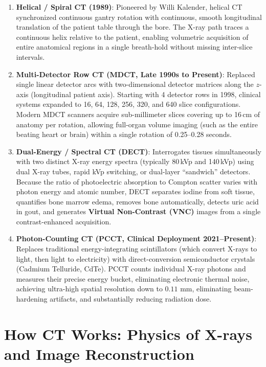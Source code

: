 \documentclass[11pt,a4paper]{article}
\begin{document}
\begin{enumerate}[leftmargin=*]
    \item \textbf{Helical / Spiral CT (1989)}: Pioneered by Willi Kalender, helical CT synchronized continuous gantry rotation with continuous, smooth longitudinal translation of the patient table through the bore. The X-ray path traces a continuous helix relative to the patient, enabling volumetric acquisition of entire anatomical regions in a single breath-hold without missing inter-slice intervals.
    \item \textbf{Multi-Detector Row CT (MDCT, Late 1990s to Present)}: Replaced single linear detector arcs with two-dimensional detector matrices along the $z$-axis (longitudinal patient axis). Starting with 4 detector rows in 1998, clinical systems expanded to 16, 64, 128, 256, 320, and 640 slice configurations. Modern MDCT scanners acquire sub-millimeter slices covering up to 16\,cm of anatomy per rotation, allowing full-organ volume imaging (such as the entire beating heart or brain) within a single rotation of 0.25--0.28 seconds.
    \item \textbf{Dual-Energy / Spectral CT (DECT)}: Interrogates tissues simultaneously with two distinct X-ray energy spectra (typically 80\,kVp and 140\,kVp) using dual X-ray tubes, rapid kVp switching, or dual-layer ``sandwich'' detectors. Because the ratio of photoelectric absorption to Compton scatter varies with photon energy and atomic number, DECT separates iodine from soft tissue, quantifies bone marrow edema, removes bone automatically, detects uric acid in gout, and generates \textbf{Virtual Non-Contrast (VNC)} images from a single contrast-enhanced acquisition.
    \item \textbf{Photon-Counting CT (PCCT, Clinical Deployment 2021--Present)}: Replaces traditional energy-integrating scintillators (which convert X-rays to light, then light to electricity) with direct-conversion semiconductor crystals (Cadmium Telluride, CdTe). PCCT counts individual X-ray photons and measures their precise energy bucket, eliminating electronic thermal noise, achieving ultra-high spatial resolution down to $0.11\text{ mm}$, eliminating beam-hardening artifacts, and substantially reducing radiation dose.
\end{enumerate}

\section{How CT Works: Physics of X-rays and Image Reconstruction}
\end{document}
